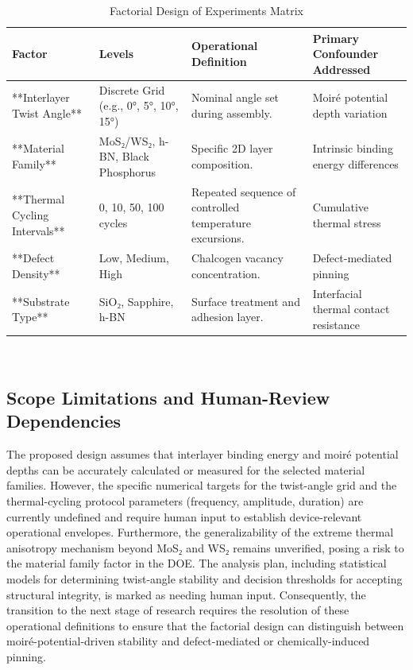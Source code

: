 \documentclass[conference]{IEEEtran}
\begin{document}
\begin{table}[htbp]
\centering
\footnotesize
\setlength{\tabcolsep}{3pt}
\renewcommand{\arraystretch}{1.12}
\caption{Factorial Design of Experiments Matrix}
\label{tab:materials-and-characterization-doe-matrix}
\begin{tabular}{|p{}|p{}|p{}|p{}|}
\hline
Factor & Levels & Operational Definition & Primary Confounder Addressed \\\hline
**Interlayer Twist Angle** & Discrete Grid (e.g., 0°, 5°, 10°, 15°) & Nominal angle set during assembly. & Moiré potential depth variation \\\hline
**Material Family** & MoS₂/WS₂, h-BN, Black Phosphorus & Specific 2D layer composition. & Intrinsic binding energy differences \\\hline
**Thermal Cycling Intervals** & 0, 10, 50, 100 cycles & Repeated sequence of controlled temperature excursions. & Cumulative thermal stress \\\hline
**Defect Density** & Low, Medium, High & Chalcogen vacancy concentration. & Defect-mediated pinning \\\hline
**Substrate Type** & SiO₂, Sapphire, h-BN & Surface treatment and adhesion layer. & Interfacial thermal contact resistance \\\hline
\end{tabular}
\end{table}~\cite{cite_26ecaf73d88dfe33,cite_b9cc1fcb55e94349}

\subsection{Scope Limitations and Human-Review Dependencies}
The proposed design assumes that interlayer binding energy and moiré potential depths can be accurately calculated or measured for the selected material families. However, the specific numerical targets for the twist-angle grid and the thermal-cycling protocol parameters (frequency, amplitude, duration) are currently undefined and require human input to establish device-relevant operational envelopes. Furthermore, the generalizability of the extreme thermal anisotropy mechanism beyond MoS₂ and WS₂ remains unverified, posing a risk to the material family factor in the DOE. The analysis plan, including statistical models for determining twist-angle stability and decision thresholds for accepting structural integrity, is marked as needing human input. Consequently, the transition to the next stage of research requires the resolution of these operational definitions to ensure that the factorial design can distinguish between moiré-potential-driven stability and defect-mediated or chemically-induced pinning.~\cite{cite_26ecaf73d88dfe33}
\end{document}
